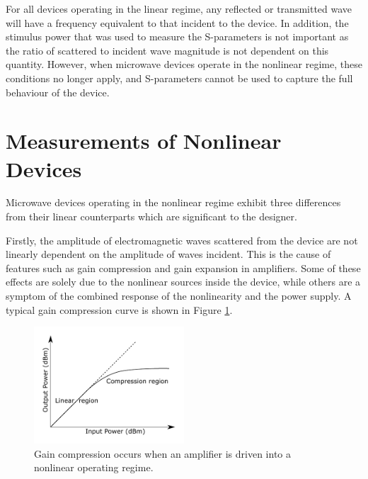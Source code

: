 \documentclass[../thesis/thesis.tex]{subfiles}
\begin{document}
\begin{refsection}
For all devices operating in the linear regime, any reflected or transmitted wave will have a frequency equivalent to that incident to the device. In addition, the stimulus power that was used to measure the S-parameters is not important as the ratio of scattered to incident wave magnitude is not dependent on this quantity. However, when microwave devices operate in the nonlinear regime, these conditions no longer apply, and S-parameters cannot be used to capture the full behaviour of the device.

\section{Measurements of Nonlinear Devices}

Microwave devices operating in the nonlinear regime exhibit three differences from their linear counterparts which are significant to the designer.

Firstly, the amplitude of electromagnetic waves scattered from the device are not linearly dependent on the amplitude of waves incident. This is the cause of features such as gain compression and gain expansion in amplifiers. Some of these effects are solely due to the nonlinear sources inside the device, while others are a symptom of the combined response of the nonlinearity and the power supply. A typical gain compression curve is shown in Figure \ref{ch2_fig_comp}.

\begin{figure}
	\centering
	\includegraphics[width=0.5\textwidth]{ch2_compression}
	\caption[An illustration of gain compression.]{Gain compression occurs when an amplifier is driven into a nonlinear operating regime.}
	\label{ch2_fig_comp}
\end{figure}


\end{refsection}
\end{document}
